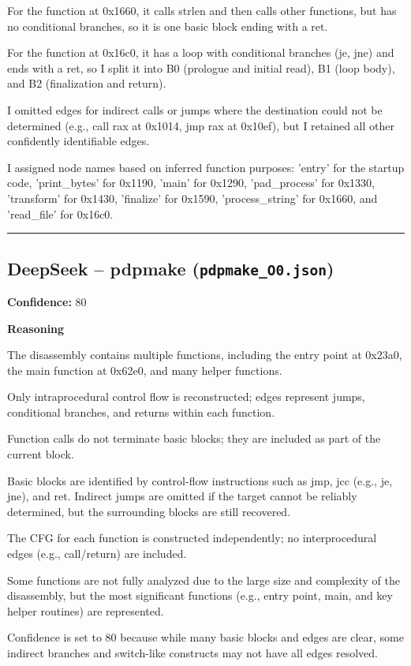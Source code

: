 For the function at 0x1660, it calls strlen and then calls other functions, but has no conditional branches, so it is one basic block ending with a ret.

For the function at 0x16c0, it has a loop with conditional branches (je, jne) and ends with a ret, so I split it into B0 (prologue and initial read), B1 (loop body), and B2 (finalization and return).

I omitted edges for indirect calls or jumps where the destination could not be determined (e.g., call rax at 0x1014, jmp rax at 0x10ef), but I retained all other confidently identifiable edges.

I assigned node names based on inferred function purposes: 'entry' for the startup code, 'print\_bytes' for 0x1190, 'main' for 0x1290, 'pad\_process' for 0x1330, 'transform' for 0x1430, 'finalize' for 0x1590, 'process\_string' for 0x1660, and 'read\_file' for 0x16c0.

\bigskip
\hrule
\bigskip

\subsection{DeepSeek -- pdpmake (\texttt{pdpmake\_O0.json})}

\textbf{Confidence:} 80

\textbf{Reasoning}

The disassembly contains multiple functions, including the entry point at 0x23a0, the main function at 0x62e0, and many helper functions.

Only intraprocedural control flow is reconstructed; edges represent jumps, conditional branches, and returns within each function.

Function calls do not terminate basic blocks; they are included as part of the current block.

Basic blocks are identified by control-flow instructions such as jmp, jcc (e.g., je, jne), and ret. Indirect jumps are omitted if the target cannot be reliably determined, but the surrounding blocks are still recovered.

The CFG for each function is constructed independently; no interprocedural edges (e.g., call/return) are included.

Some functions are not fully analyzed due to the large size and complexity of the disassembly, but the most significant functions (e.g., entry point, main, and key helper routines) are represented.

Confidence is set to 80 because while many basic blocks and edges are clear, some indirect branches and switch-like constructs may not have all edges resolved.

